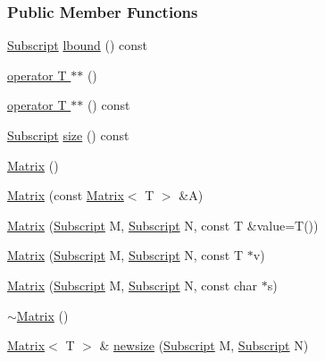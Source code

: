\subsubsection*{Public Member Functions}
\begin{DoxyCompactItemize}
\item 
\hyperlink{namespace_t_n_t_af22e3f1460e145c04ce4e7d701e4c1c1}{Subscript} \hyperlink{class_t_n_t_1_1_matrix_abc5f4f03814ac773f393711881e65536}{lbound} () const 
\item 
\hyperlink{class_t_n_t_1_1_matrix_a38cbed657ebe06ea5767fcb593aa2bbf}{operator T $\ast$$\ast$} ()
\item 
\hyperlink{class_t_n_t_1_1_matrix_aba9b50ec4591ab67cc759e858429f368}{operator T $\ast$$\ast$} () const 
\item 
\hyperlink{namespace_t_n_t_af22e3f1460e145c04ce4e7d701e4c1c1}{Subscript} \hyperlink{class_t_n_t_1_1_matrix_aef58599b7a9dc39061b94007a3f71c00}{size} () const 
\item 
\hyperlink{class_t_n_t_1_1_matrix_a38e705abbbd5155756241db959bae662}{Matrix} ()
\item 
\hyperlink{class_t_n_t_1_1_matrix_aa6cd1bfe3ede4545d0e6693a443b50f1}{Matrix} (const \hyperlink{class_t_n_t_1_1_matrix}{Matrix}$<$ T $>$ \&A)
\item 
\hyperlink{class_t_n_t_1_1_matrix_ae79fec5ae7648b9971523bcc123af764}{Matrix} (\hyperlink{namespace_t_n_t_af22e3f1460e145c04ce4e7d701e4c1c1}{Subscript} M, \hyperlink{namespace_t_n_t_af22e3f1460e145c04ce4e7d701e4c1c1}{Subscript} N, const T \&value=T())
\item 
\hyperlink{class_t_n_t_1_1_matrix_ac66034c440243c8ff299c0c0774ad82d}{Matrix} (\hyperlink{namespace_t_n_t_af22e3f1460e145c04ce4e7d701e4c1c1}{Subscript} M, \hyperlink{namespace_t_n_t_af22e3f1460e145c04ce4e7d701e4c1c1}{Subscript} N, const T $\ast$v)
\item 
\hyperlink{class_t_n_t_1_1_matrix_a4f19bfddcd8e952d7709d3d4b969bd44}{Matrix} (\hyperlink{namespace_t_n_t_af22e3f1460e145c04ce4e7d701e4c1c1}{Subscript} M, \hyperlink{namespace_t_n_t_af22e3f1460e145c04ce4e7d701e4c1c1}{Subscript} N, const char $\ast$s)
\item 
\hyperlink{class_t_n_t_1_1_matrix_ac3cd6db0fe4b5aecd460c99b8a456aae}{$\sim$Matrix} ()
\item 
\hyperlink{class_t_n_t_1_1_matrix}{Matrix}$<$ T $>$ \& \hyperlink{class_t_n_t_1_1_matrix_a2fa0b7e3924a7a51d2973b93b698aa05}{newsize} (\hyperlink{namespace_t_n_t_af22e3f1460e145c04ce4e7d701e4c1c1}{Subscript} M, \hyperlink{namespace_t_n_t_af22e3f1460e145c04ce4e7d701e4c1c1}{Subscript} N)

\end{DoxyCompactItemize}
